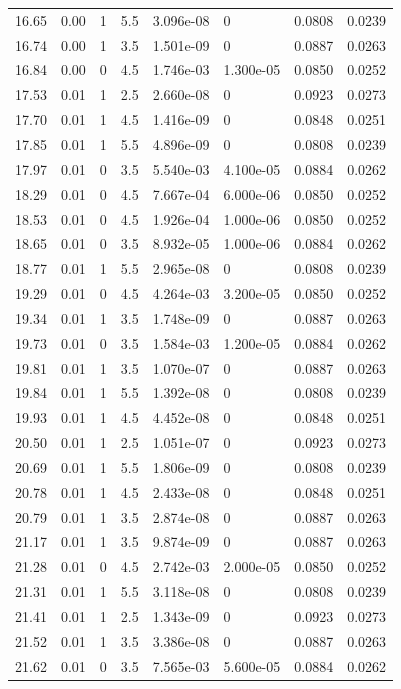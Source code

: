 \documentclass[preview]{standalone}
\begin{document}
{{\begin{tabular}{L{1.2cm}C{1.2cm} C{0.3cm}C{0.5cm} C{1.4cm}C{1.4cm} C{1.4cm}C{1.4cm}}
  16.65  &  0.00  & 1     & 5.5 &  3.096e-08  & 0  & 0.0808 &  0.0239   \\ 
  16.74  &  0.00  & 1     & 3.5 &  1.501e-09  & 0  & 0.0887 &  0.0263   \\ 
  16.84  &  0.00  & 0     & 4.5 &  1.746e-03  & 1.300e-05  & 0.0850 &  0.0252   \\ 
  17.53  &  0.01  & 1     & 2.5 &  2.660e-08  & 0  & 0.0923 &  0.0273   \\ 
  17.70  &  0.01  & 1     & 4.5 &  1.416e-09  & 0  & 0.0848 &  0.0251   \\ 
  17.85  &  0.01  & 1     & 5.5 &  4.896e-09  & 0  & 0.0808 &  0.0239   \\ 
  17.97  &  0.01  & 0     & 3.5 &  5.540e-03  & 4.100e-05  & 0.0884 &  0.0262   \\ 
  18.29  &  0.01  & 0     & 4.5 &  7.667e-04  & 6.000e-06  & 0.0850 &  0.0252   \\ 
  18.53  &  0.01  & 0     & 4.5 &  1.926e-04  & 1.000e-06  & 0.0850 &  0.0252   \\ 
  18.65  &  0.01  & 0     & 3.5 &  8.932e-05  & 1.000e-06  & 0.0884 &  0.0262   \\ 
  18.77  &  0.01  & 1     & 5.5 &  2.965e-08  & 0  & 0.0808 &  0.0239   \\ 
  19.29  &  0.01  & 0     & 4.5 &  4.264e-03  & 3.200e-05  & 0.0850 &  0.0252   \\ 
  19.34  &  0.01  & 1     & 3.5 &  1.748e-09  & 0  & 0.0887 &  0.0263   \\ 
  19.73  &  0.01  & 0     & 3.5 &  1.584e-03  & 1.200e-05  & 0.0884 &  0.0262   \\ 
  19.81  &  0.01  & 1     & 3.5 &  1.070e-07  & 0  & 0.0887 &  0.0263   \\ 
  19.84  &  0.01  & 1     & 5.5 &  1.392e-08  & 0  & 0.0808 &  0.0239   \\ 
  19.93  &  0.01  & 1     & 4.5 &  4.452e-08  & 0  & 0.0848 &  0.0251   \\ 
  20.50  &  0.01  & 1     & 2.5 &  1.051e-07  & 0  & 0.0923 &  0.0273   \\ 
  20.69  &  0.01  & 1     & 5.5 &  1.806e-09  & 0  & 0.0808 &  0.0239   \\ 
  20.78  &  0.01  & 1     & 4.5 &  2.433e-08  & 0  & 0.0848 &  0.0251   \\ 
  20.79  &  0.01  & 1     & 3.5 &  2.874e-08  & 0  & 0.0887 &  0.0263   \\ 
  21.17  &  0.01  & 1     & 3.5 &  9.874e-09  & 0  & 0.0887 &  0.0263   \\ 
  21.28  &  0.01  & 0     & 4.5 &  2.742e-03  & 2.000e-05  & 0.0850 &  0.0252   \\ 
  21.31  &  0.01  & 1     & 5.5 &  3.118e-08  & 0  & 0.0808 &  0.0239   \\ 
  21.41  &  0.01  & 1     & 2.5 &  1.343e-09  & 0  & 0.0923 &  0.0273   \\ 
  21.52  &  0.01  & 1     & 3.5 &  3.386e-08  & 0  & 0.0887 &  0.0263   \\ 
  21.62  &  0.01  & 0     & 3.5 &  7.565e-03  & 5.600e-05  & 0.0884 &  0.0262   \\ 
\hline 
\end{tabular} 

}}
\end{document}
